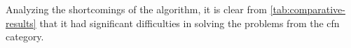 Analyzing the shortcomings of the algorithm, it is clear from \cref{tab:comparative-results} that it had significant difficulties in solving the problems from the \gls{cfn} category.







% 




